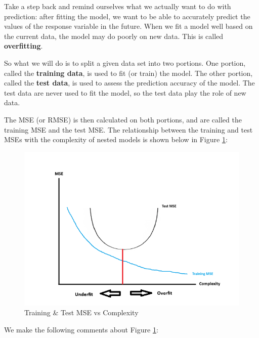 \documentclass[
]{book}
\begin{document}
Take a step back and remind ourselves what we actually want to do with prediction: after fitting the model, we want to be able to accurately predict the values of the response variable in the future. When we fit a model well based on the current data, the model may do poorly on new data. This is called \textbf{overfitting}.

So what we will do is to split a given data set into two portions. One portion, called the \textbf{training data}, is used to fit (or train) the model. The other portion, called the \textbf{test data}, is used to assess the prediction accuracy of the model. The test data are never used to fit the model, so the test data play the role of new data.

The MSE (or RMSE) is then calculated on both portions, and are called the training MSE and the test MSE. The relationship between the training and test MSEs with the complexity of nested models is shown below in Figure \ref{fig:10-MSE}:

\begin{figure}
\centering
\includegraphics{images/10-MSE.png}
\caption{\label{fig:10-MSE}Training \& Test MSE vs Complexity}
\end{figure}

We make the following comments about Figure \ref{fig:10-MSE}:
\end{document}
